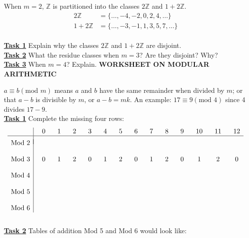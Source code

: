 \documentclass[12pt, fleqn, twoside]{book}
\makeatletter
\def\cleardoublepage{\clearpage\if@twoside \ifodd\c@page\else
   \hbox{}\thispagestyle{empty}\newpage\if@twocolumn\hbox{}\newpage\fi\fi\fi}
\makeatother
\begin{document}
When $m=2$, $\mathbb{Z}$ is partitioned into the classes $2\mathbb{Z}$ and $1+2\mathbb{Z}$.
\begin{equation*}\begin{split}
2\mathbb{Z} &= \{\dots, -4, -2, 0, 2, 4, \dots\}\\
1+2\mathbb{Z} &= \{\dots, -3, -1, 1, 3, 5, 7, \dots\}
\end{split}\end{equation*}\\[.2in]
\underline{\bf{Task 1}} Explain why the classes $2\mathbb{Z}$ and $1+2\mathbb{Z}$ are disjoint.\\[2in]
\underline{\bf{Task 2}} What the residue classes when $m=3$?  Are they disjoint?  Why?\\[1.5in]
\underline{\bf{Task 3}}  When $m=4$?  Explain.
%
%
%
\cleardoublepage%
%
%
%
{\large \bf WORKSHEET ON MODULAR ARITHMETIC}\\[.25in]
$a\equiv b(\text{mod }m)$ means $a$ and $b$ have the same remainder when divided by $m$; or that $a-b$ is divisible by $m$, or $a-b=mk$.  An example: $17\equiv 9(\text{mod } 4)$ since 4 divides $17-9$.\\[.25in]
\underline{\bf{Task 1}} Complete the missing four rows:
$$\begin{array}{c|ccccccccccccc}
&\phantom{-}0&\phantom{-}1&\phantom{-}2&\phantom{-}3&\phantom{-}4&\phantom{-}5&\phantom{-}6&\phantom{-}7&\phantom{-}8&\phantom{-}9&\phantom{-}10&\phantom{-}11&\phantom{-}12\\
\hline\\[-.1in]
\text{Mod } 2&&&&&&&&&&&&&\\
\\
\text{Mod } 3&\phantom{-}0&\phantom{-}1&\phantom{-}2&\phantom{-}0&\phantom{-}1&\phantom{-}2&\phantom{-}0&\phantom{-}1&\phantom{-}2&\phantom{-}0&\phantom{-}1&\phantom{-}2&\phantom{-}0\\
\\
\text{Mod } 4&\\
\\
\text{Mod } 5&\\
\\
\text{Mod } 6&
\end{array}$$\\[1.5in]
\underline{\bf{Task 2}} Tables of addition Mod 5 and Mod 6 would look like:\\[.2in]
\end{document}
